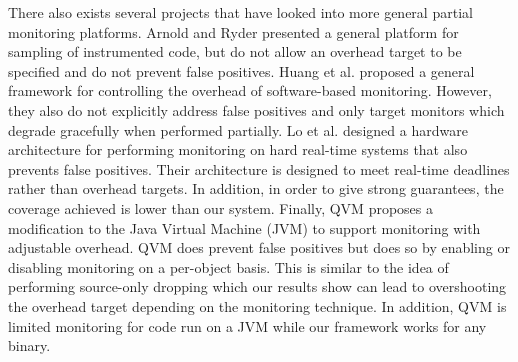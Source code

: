 There also exists several projects that have looked into more general partial
monitoring platforms. Arnold and Ryder \cite{arnold-pldi01} presented a general
platform for sampling of instrumented code, but do not allow an overhead target
to be specified and do not prevent false positives. Huang et al.
\cite{huang-sttt12} proposed a general framework for controlling the overhead
of software-based monitoring. However, they also do not explicitly address
false positives and only target monitors which degrade gracefully when
performed partially. Lo et al. \cite{lo-rtas14} designed a hardware
architecture for performing monitoring on hard real-time systems that also
prevents false positives. Their architecture is designed to meet real-time
deadlines rather than overhead targets. In addition, in order to give strong
guarantees, the coverage achieved is lower than our system. Finally, QVM
\cite{qvm-oopsla08} proposes a modification to the Java Virtual Machine (JVM) to
support monitoring with adjustable overhead. QVM does prevent false positives
but does so by enabling or disabling monitoring on a per-object basis. This is
similar to the idea of performing source-only dropping which our results show
can lead to overshooting the overhead target depending on the monitoring
technique. In addition, QVM is limited monitoring for code run on a JVM while
our framework works for any binary.



